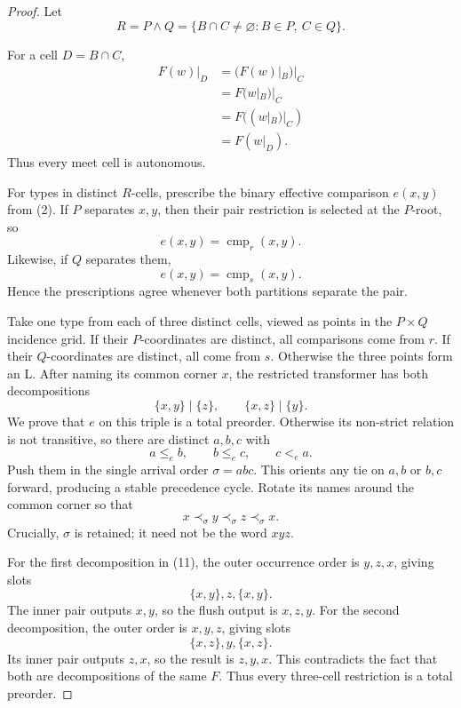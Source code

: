 \documentclass[11pt]{article}
\begin{document}
\begin{proof}
Let
\[
R=P\wedge Q
=\{B\cap C\ne\varnothing:B\in P,\ C\in Q\}.
\]

For a cell $D=B\cap C$,
\begin{equation}
\begin{aligned}
F(w)|_D
&=(F(w)|_B)|_C\\
&=F(w|_B)|_C\\
&=F((w|_B)|_C)\\
&=F(w|_D).
\end{aligned}
\tag{8}
\end{equation}
Thus every meet cell is autonomous.

For types in distinct $R$-cells, prescribe the binary effective comparison $e(x,y)$ from (2).  If $P$ separates $x,y$, then their pair restriction is selected at the $P$-root, so
\begin{equation}
e(x,y)=\operatorname{cmp}_r(x,y).
\tag{9}
\end{equation}
Likewise, if $Q$ separates them,
\begin{equation}
e(x,y)=\operatorname{cmp}_s(x,y).
\tag{10}
\end{equation}
Hence the prescriptions agree whenever both partitions separate the pair.

Take one type from each of three distinct cells, viewed as points in the $P\times Q$ incidence grid.  If their $P$-coordinates are distinct, all comparisons come from $r$.  If their $Q$-coordinates are distinct, all come from $s$.  Otherwise the three points form an L.  After naming its common corner $x$, the restricted transformer has both decompositions
\begin{equation}
\{x,y\}\mid\{z\},
\qquad
\{x,z\}\mid\{y\}.
\tag{11}
\end{equation}
We prove that $e$ on this triple is a total preorder.  Otherwise its non-strict relation is not transitive, so there are distinct $a,b,c$ with
\[
a\le_e b,\qquad b\le_e c,\qquad c<_e a.
\]
Push them in the single arrival order $\sigma=abc$.  This orients any tie on $a,b$ or $b,c$ forward, producing a stable precedence cycle.  Rotate its names around the common corner so that
\begin{equation}
x\prec_\sigma y\prec_\sigma z\prec_\sigma x.
\tag{12}
\end{equation}
Crucially, $\sigma$ is retained; it need not be the word $xyz$.

For the first decomposition in (11), the outer occurrence order is $y,z,x$, giving slots
\[
\{x,y\},z,\{x,y\}.
\]
The inner pair outputs $x,y$, so the flush output is $x,z,y$.  For the second decomposition, the outer order is $x,y,z$, giving slots
\[
\{x,z\},y,\{x,z\}.
\]
Its inner pair outputs $z,x$, so the result is $z,y,x$.  This contradicts the fact that both are decompositions of the same $F$.  Thus every three-cell restriction is a total preorder.


\end{proof}
\end{document}
